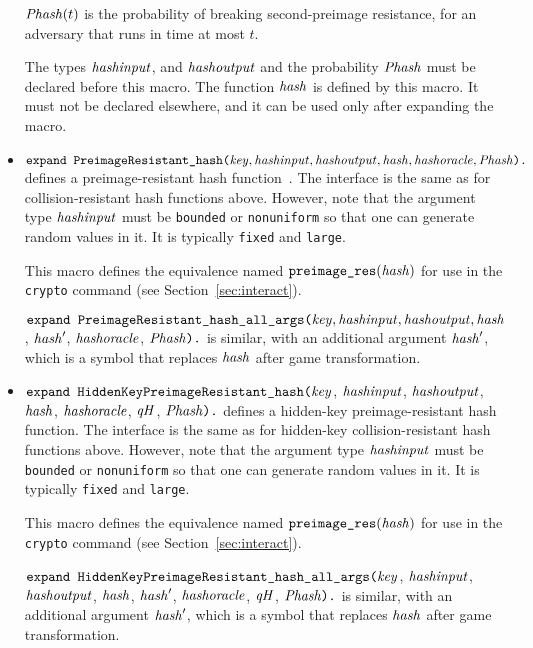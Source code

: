 \documentclass{article}
\begin{document}
\begin{itemize}
   $\mathit{Phash}(t)$ is the probability of breaking second-preimage resistance,
   for an adversary that runs in time at most $t$.

   The types $\mathit{hashinput}$, and $\mathit{hashoutput}$ and the
   probability $\mathit{Phash}$ must be declared before this macro.  The
   function $\mathit{hash}$ is defined by this macro. It must not be
   declared elsewhere, and it can be used only after expanding the
   macro.

\item $\texttt{expand PreimageResistant\_hash(}\mathit{key}, \mathit{hashinput}, \mathit{hashoutput}, \mathit{hash}, \mathit{hashoracle}, \mathit{Phash}\texttt{).}$
defines a preimage-resistant hash function~\cite{Rogaway04}. The interface is the same as for collision-resistant hash functions above. However, note that the argument type $\mathit{hashinput}$ must be \texttt{bounded} or \texttt{nonuniform} so that one can generate random values in it. It is typically \texttt{fixed} and \texttt{large}.

   This macro defines the equivalence named
   $\texttt{preimage\_res}(\mathit{hash})$ for use in the
   \texttt{crypto} command (see Section~\ref{sec:interact}).

$\texttt{expand PreimageResistant\_hash\_all\_args(}\mathit{key}, \mathit{hashinput}, \mathit{hashoutput}, \mathit{hash}$, $\mathit{hash}'$, $\mathit{hashoracle}$, $\mathit{Phash}\texttt{).}$ is similar, with an additional argument $\mathit{hash}'$, which is a symbol that replaces $\mathit{hash}$ after game transformation.

\item $\texttt{expand HiddenKeyPreimageResistant\_hash(}\mathit{key}$, $\mathit{hashinput}$, $\mathit{hashoutput}$, $\mathit{hash}$, $\mathit{hashoracle}$, $\mathit{qH}$, $\mathit{Phash}\texttt{).}$
defines a hidden-key preimage-resistant hash function. The interface is the same as for hidden-key collision-resistant hash functions above. However, note that the argument type $\mathit{hashinput}$ must be \texttt{bounded} or \texttt{nonuniform} so that one can generate random values in it. It is typically \texttt{fixed} and \texttt{large}.

   This macro defines the equivalence named
   $\texttt{preimage\_res}(\mathit{hash})$ for use in the
   \texttt{crypto} command (see Section~\ref{sec:interact}).

$\texttt{expand HiddenKeyPreimageResistant\_hash\_all\_args(}\mathit{key}$, $\mathit{hashinput}$, $\mathit{hashoutput}$, $\mathit{hash}$, $\mathit{hash}'$, $\mathit{hashoracle}$, $\mathit{qH}$, $\mathit{Phash}\texttt{).}$ is similar, with an additional argument $\mathit{hash}'$, which is a symbol that replaces $\mathit{hash}$ after game transformation.


\end{itemize}
\end{document}

